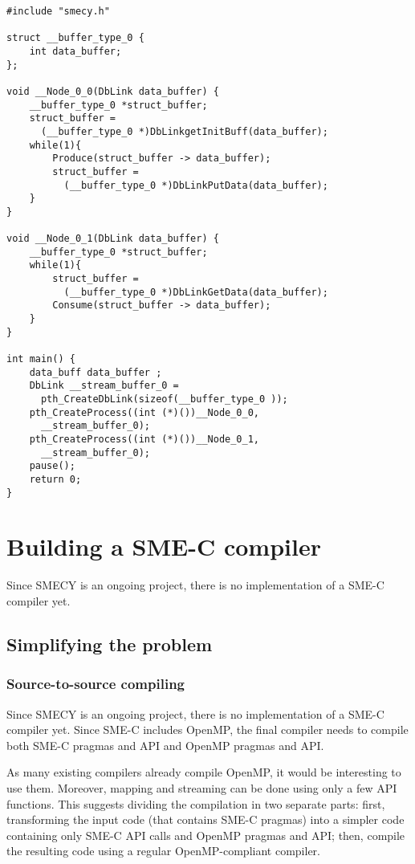 \documentclass[a4paper]{article}
\begin{document}
	\begin{lstlisting}[label=streamoutput,caption={Possible output
code. The definitions of \texttt{Produce} and \texttt{Consume} functions are not shown.}]
#include "smecy.h" 

struct __buffer_type_0 {
	int data_buffer;
};

void __Node_0_0(DbLink data_buffer) {
	__buffer_type_0 *struct_buffer;
	struct_buffer =
	  (__buffer_type_0 *)DbLinkgetInitBuff(data_buffer);
	while(1){
		Produce(struct_buffer -> data_buffer);
		struct_buffer = 
		  (__buffer_type_0 *)DbLinkPutData(data_buffer);
	}
}

void __Node_0_1(DbLink data_buffer) {
	__buffer_type_0 *struct_buffer;
	while(1){
		struct_buffer = 
		  (__buffer_type_0 *)DbLinkGetData(data_buffer);
		Consume(struct_buffer -> data_buffer);
	}
}

int main() {
	data_buff data_buffer ;
	DbLink __stream_buffer_0 = 
	  pth_CreateDbLink(sizeof(__buffer_type_0 ));
	pth_CreateProcess((int (*)())__Node_0_0,
	  __stream_buffer_0);
	pth_CreateProcess((int (*)())__Node_0_1,
	  __stream_buffer_0);
	pause();
	return 0;
}
	\end{lstlisting}
	
\section{Building a SME-C compiler}

	Since SMECY is an ongoing project, there is no implementation of a SME-C compiler yet.
	
	\subsection{Simplifying the problem}

	\subsubsection{Source-to-source compiling}
	Since SMECY is an ongoing project, there is no implementation of a SME-C compiler yet. Since SME-C includes OpenMP, the final compiler needs to compile both SME-C pragmas and API and OpenMP pragmas and API.
	
	As many existing compilers already compile OpenMP, it would be interesting to use them. Moreover, mapping and streaming can be done using only a few API functions. This suggests dividing the compilation in two separate parts: first, transforming the input code (that contains SME-C pragmas) into a simpler code containing only SME-C API calls and OpenMP pragmas and API; then, compile the resulting code using a regular OpenMP-compliant compiler.
\end{document}
